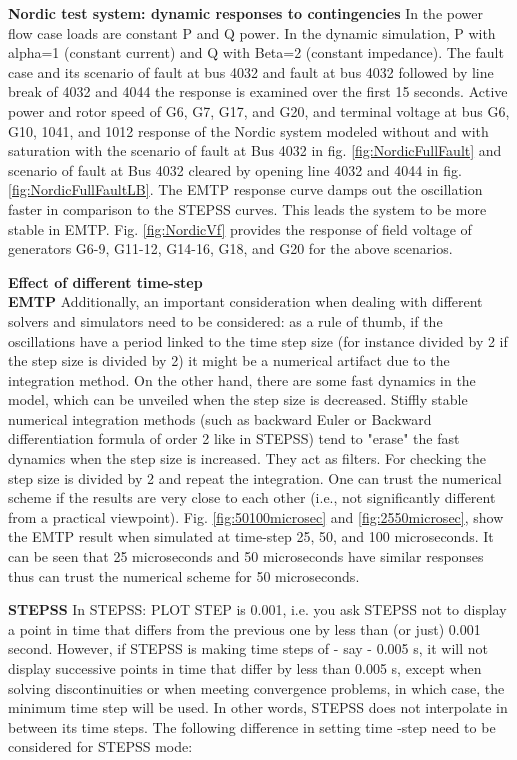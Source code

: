 \documentclass{report}
\begin{document}
\textbf{Nordic test system: dynamic responses to contingencies}
In the power flow case loads are constant P and Q power. In the dynamic simulation, P with alpha=1 (constant current)  and Q with Beta=2 (constant impedance). The fault case and its scenario of fault at bus 4032 and fault at bus 4032 followed by line break of 4032 and 4044 the response is examined over the first 15 seconds. Active power and rotor speed of G6, G7, G17, and G20, and terminal voltage at bus G6, G10, 1041, and 1012 response of the Nordic system modeled without and with saturation with the scenario of fault at Bus 4032 in fig. \ref{fig:NordicFullFault} and scenario of fault at Bus 4032 cleared by opening line 4032 and 4044 in fig. \ref{fig:NordicFullFaultLB}. The EMTP response curve damps out the oscillation faster in comparison to the STEPSS curves. This leads the system to be more stable in EMTP. Fig. \ref{fig:NordicVf} provides the response of field voltage of generators G6-9, G11-12, G14-16, G18, and G20 for the above scenarios. 

\textbf{Effect of different time-step}\\
\textbf{EMTP}
Additionally, an important consideration when dealing with different solvers and simulators need to be considered: as a rule of thumb, if the oscillations have a period linked to the time step size (for instance divided by 2 if the step size is divided by 2) it might be a numerical artifact due to the integration method. On the other hand, there are some fast dynamics in the model, which can be unveiled when the step size is decreased. Stiffly stable numerical integration methods (such as backward Euler or Backward differentiation formula of order 2 like in STEPSS) tend to "erase" the fast dynamics when the step size is increased. They act as filters. For checking the step size is divided by 2 and repeat the integration. One can trust the numerical scheme if the results are very close to each other (i.e., not significantly different from a practical viewpoint). Fig. \ref{fig:50100microsec} and \ref{fig:2550microsec}, show the EMTP result when simulated at time-step 25, 50, and 100 microseconds. It can be seen that 25 microseconds and 50 microseconds have similar responses thus can trust the numerical scheme for 50 microseconds.  

\textbf{STEPSS}
In STEPSS: PLOT STEP is 0.001, i.e.
you ask STEPSS not to display a point in time that differs from the previous one by less than (or just) 0.001 second. However, if STEPSS is making time steps of - say - 0.005 s, it will not display successive points in time that differ by less than 0.005 s, except when solving discontinuities or when meeting convergence problems, in which case, the minimum time step will be used. In other words, STEPSS does not interpolate in between its time steps. The following difference in setting time -step need to be considered for STEPSS mode:
\end{document}
